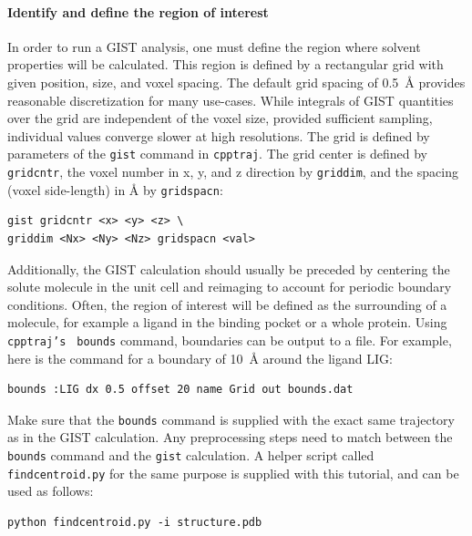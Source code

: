 \documentclass[9pt,tutorial]{livecoms}
\newcommand{\software}{\texttt}
\newcommand\inlinecode{\texttt}
\begin{document}
\paragraph{Identify and define the region of interest}
In order to run a GIST analysis, one must define the region where solvent properties will be calculated.
This region is defined by a rectangular grid with given position, size, and voxel spacing.
The default grid spacing of \SI{0.5}{\angstrom} provides reasonable discretization for many use-cases.
While integrals of GIST quantities over the grid are independent of the voxel size, provided sufficient sampling, individual values converge slower at high resolutions.
The grid is defined by parameters of the \inlinecode{gist} command in \software{cpptraj}.
The grid center is defined by \inlinecode{gridcntr}, the voxel number in x, y, and z direction by \inlinecode{griddim}, and the spacing (voxel side-length) in \AA{} by \inlinecode{gridspacn}:

\begin{lstlisting}[style=cpptraj]
gist gridcntr <x> <y> <z> \
griddim <Nx> <Ny> <Nz> gridspacn <val>
\end{lstlisting}
Additionally, the GIST calculation should usually be preceded by centering the solute molecule in the unit cell and reimaging to account for periodic boundary conditions.
Often, the region of interest will be defined as the surrounding of a molecule, for example a ligand in the binding pocket or a whole protein. 
Using \inlinecode{cpptraj's } \inlinecode{bounds} command, boundaries can be output to a file. For example, here is the command for a boundary of \SI{10}{\angstrom} around the ligand LIG:

\begin{lstlisting}[style=cpptraj]
bounds :LIG dx 0.5 offset 20 name Grid out bounds.dat
\end{lstlisting}
\begin{minipage}{\linewidth} %
Make sure that the \inlinecode{bounds} command is supplied with the exact same trajectory as in the GIST calculation. Any preprocessing steps need to match between the \inlinecode{bounds} command and the \inlinecode{gist} calculation. A helper script called \inlinecode{findcentroid.py} for the same purpose is supplied with this tutorial, and can be used as follows:
~
\begin{lstlisting}[style=bash]
python findcentroid.py -i structure.pdb
\end{lstlisting}
\end{minipage}
\end{document}
